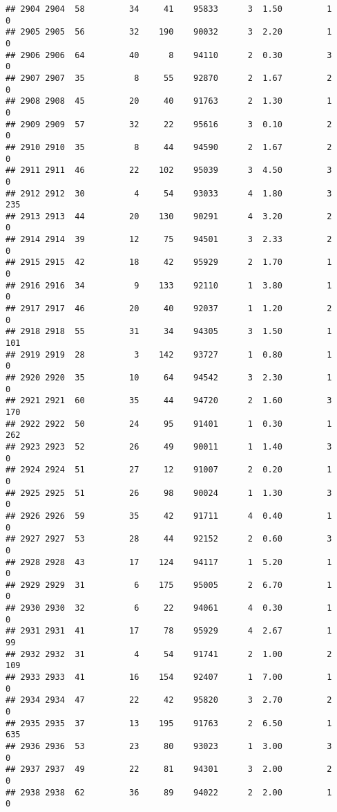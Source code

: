\documentclass[
]{article}
\begin{document}
\begin{verbatim}
## 2904 2904  58         34     41    95833      3  1.50         1        0
## 2905 2905  56         32    190    90032      3  2.20         1        0
## 2906 2906  64         40      8    94110      2  0.30         3        0
## 2907 2907  35          8     55    92870      2  1.67         2        0
## 2908 2908  45         20     40    91763      2  1.30         1        0
## 2909 2909  57         32     22    95616      3  0.10         2        0
## 2910 2910  35          8     44    94590      2  1.67         2        0
## 2911 2911  46         22    102    95039      3  4.50         3        0
## 2912 2912  30          4     54    93033      4  1.80         3      235
## 2913 2913  44         20    130    90291      4  3.20         2        0
## 2914 2914  39         12     75    94501      3  2.33         2        0
## 2915 2915  42         18     42    95929      2  1.70         1        0
## 2916 2916  34          9    133    92110      1  3.80         1        0
## 2917 2917  46         20     40    92037      1  1.20         2        0
## 2918 2918  55         31     34    94305      3  1.50         1      101
## 2919 2919  28          3    142    93727      1  0.80         1        0
## 2920 2920  35         10     64    94542      3  2.30         1        0
## 2921 2921  60         35     44    94720      2  1.60         3      170
## 2922 2922  50         24     95    91401      1  0.30         1      262
## 2923 2923  52         26     49    90011      1  1.40         3        0
## 2924 2924  51         27     12    91007      2  0.20         1        0
## 2925 2925  51         26     98    90024      1  1.30         3        0
## 2926 2926  59         35     42    91711      4  0.40         1        0
## 2927 2927  53         28     44    92152      2  0.60         3        0
## 2928 2928  43         17    124    94117      1  5.20         1        0
## 2929 2929  31          6    175    95005      2  6.70         1        0
## 2930 2930  32          6     22    94061      4  0.30         1        0
## 2931 2931  41         17     78    95929      4  2.67         1       99
## 2932 2932  31          4     54    91741      2  1.00         2      109
## 2933 2933  41         16    154    92407      1  7.00         1        0
## 2934 2934  47         22     42    95820      3  2.70         2        0
## 2935 2935  37         13    195    91763      2  6.50         1      635
## 2936 2936  53         23     80    93023      1  3.00         3        0
## 2937 2937  49         22     81    94301      3  2.00         2        0
## 2938 2938  62         36     89    94022      2  2.00         1        0

\end{verbatim}
\end{document}
